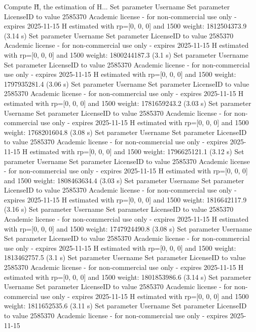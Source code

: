Compute H̃, the estimation of H...
Set parameter Username
Set parameter LicenseID to value 2585370
Academic license - for non-commercial use only - expires 2025-11-15
  H estimated with rp=[0, 0, 0] and 1500 weight:  1812504373.9  (3.14 s)
Set parameter Username
Set parameter LicenseID to value 2585370
Academic license - for non-commercial use only - expires 2025-11-15
  H estimated with rp=[0, 0, 0] and 1500 weight:  1800244187.3  (3.1 s)
Set parameter Username
Set parameter LicenseID to value 2585370
Academic license - for non-commercial use only - expires 2025-11-15
  H estimated with rp=[0, 0, 0] and 1500 weight:  1797935281.4  (3.06 s)
Set parameter Username
Set parameter LicenseID to value 2585370
Academic license - for non-commercial use only - expires 2025-11-15
  H estimated with rp=[0, 0, 0] and 1500 weight:  1781659243.2  (3.03 s)
Set parameter Username
Set parameter LicenseID to value 2585370
Academic license - for non-commercial use only - expires 2025-11-15
  H estimated with rp=[0, 0, 0] and 1500 weight:  1768201604.8  (3.08 s)
Set parameter Username
Set parameter LicenseID to value 2585370
Academic license - for non-commercial use only - expires 2025-11-15
  H estimated with rp=[0, 0, 0] and 1500 weight:  1796625121.1  (3.12 s)
Set parameter Username
Set parameter LicenseID to value 2585370
Academic license - for non-commercial use only - expires 2025-11-15
  H estimated with rp=[0, 0, 0] and 1500 weight:  1808463634.4  (3.03 s)
Set parameter Username
Set parameter LicenseID to value 2585370
Academic license - for non-commercial use only - expires 2025-11-15
  H estimated with rp=[0, 0, 0] and 1500 weight:  1816642117.9  (3.16 s)
Set parameter Username
Set parameter LicenseID to value 2585370
Academic license - for non-commercial use only - expires 2025-11-15
  H estimated with rp=[0, 0, 0] and 1500 weight:  1747924490.8  (3.08 s)
Set parameter Username
Set parameter LicenseID to value 2585370
Academic license - for non-commercial use only - expires 2025-11-15
  H estimated with rp=[0, 0, 0] and 1500 weight:  1813462757.5  (3.1 s)
Set parameter Username
Set parameter LicenseID to value 2585370
Academic license - for non-commercial use only - expires 2025-11-15
  H estimated with rp=[0, 0, 0] and 1500 weight:  1801853986.6  (3.14 s)
Set parameter Username
Set parameter LicenseID to value 2585370
Academic license - for non-commercial use only - expires 2025-11-15
  H estimated with rp=[0, 0, 0] and 1500 weight:  1811652535.6  (3.11 s)
Set parameter Username
Set parameter LicenseID to value 2585370
Academic license - for non-commercial use only - expires 2025-11-15
